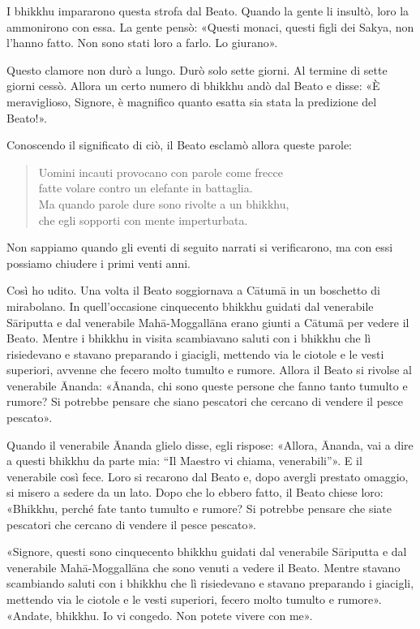 I bhikkhu impararono questa strofa dal Beato. Quando la gente li
insultò, loro la ammonirono con essa. La gente pensò: «Questi monaci,
questi figli dei Sakya, non l’hanno fatto. Non sono stati loro a farlo.
Lo giurano».


Questo clamore non durò a lungo. Durò solo sette giorni. Al termine di
sette giorni cessò. Allora un certo numero di bhikkhu andò dal Beato e
disse: «È meraviglioso, Signore, è magnifico quanto esatta sia stata la
predizione del Beato!».


Conoscendo il significato di ciò, il Beato esclamò allora queste parole:


\begin{quote}
Uomini incauti provocano con parole come frecce \\
fatte volare contro un elefante in battaglia. \\
Ma quando parole dure sono rivolte a un bhikkhu, \\
che egli sopporti con mente imperturbata.
\end{quote}



 Non sappiamo quando gli eventi di seguito narrati si
verificarono, ma con essi possiamo chiudere i primi venti anni.


 Così ho udito. Una volta il Beato soggiornava a Cātumā in un
boschetto di mirabolano. In quell’occasione cinquecento bhikkhu guidati
dal venerabile Sāriputta e dal venerabile Mahā-Moggallāna erano giunti a
Cātumā per vedere il Beato. Mentre i bhikkhu in visita scambiavano
saluti con i bhikkhu che lì risiedevano e stavano preparando i giacigli,
mettendo via le ciotole e le vesti superiori, avvenne che fecero molto
tumulto e rumore. Allora il Beato si rivolse al venerabile Ānanda:
«Ānanda, chi sono queste persone che fanno tanto tumulto e rumore? Si
potrebbe pensare che siano pescatori che cercano di vendere il pesce
pescato».


Quando il venerabile Ānanda glielo disse, egli rispose: «Allora, Ānanda,
vai a dire a questi bhikkhu da parte mia: “Il Maestro vi chiama,
venerabili”». E il venerabile così fece. Loro si recarono dal Beato e,
dopo avergli prestato omaggio, si misero a sedere da un lato. Dopo che
lo ebbero fatto, il Beato chiese loro: «Bhikkhu, perché fate tanto
tumulto e rumore? Si potrebbe pensare che siate pescatori che cercano di
vendere il pesce pescato».


«Signore, questi sono cinquecento bhikkhu guidati dal venerabile
Sāriputta e dal venerabile Mahā-Moggallāna che sono venuti a vedere il
Beato. Mentre stavano scambiando saluti con i bhikkhu che lì risiedevano
e stavano preparando i giacigli, mettendo via le ciotole e le vesti
superiori, fecero molto tumulto e rumore». «Andate, bhikkhu. Io vi
congedo. Non potete vivere con me».


